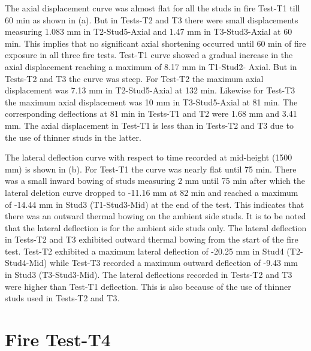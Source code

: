 The axial displacement curve was almost flat for all the studs in fire Test-T1 till 60 min as shown in  (a). But in Tests-T2 and T3 there were small displacements measuring 1.083 mm in T2-Stud5-Axial and 1.47 mm in T3-Stud3-Axial at 60 min. This implies that no significant axial shortening occurred until 60 min of fire exposure in all three fire tests. Test-T1 curve showed a gradual increase in the axial displacement reaching a maximum of 8.17 mm in T1-Stud2- Axial. But in Tests-T2 and T3 the curve was steep. For Test-T2 the maximum axial displacement was 7.13 mm in T2-Stud5-Axial at 132 min. Likewise for Test-T3 the maximum axial displacement was 10 mm in T3-Stud5-Axial at 81 min. The corresponding deflections at 81 min in Tests-T1 and T2 were 1.68 mm and 3.41 mm. The axial displacement in Test-T1 is less than in Tests-T2 and T3 due to the use of thinner studs in the latter.

The lateral deflection curve with respect to time recorded at mid-height (1500 mm) is shown in  (b). For Test-T1 the curve was nearly flat until 75 min. There was a small inward bowing of studs measuring 2 mm until 75 min after which the lateral deletion curve dropped to -11.16 mm at 82 min and reached a maximum of -14.44 mm in Stud3 (T1-Stud3-Mid) at the end of the test. This indicates that there was an outward thermal bowing on the ambient side studs. It is to be noted that the lateral deflection is for the ambient side studs only. The lateral deflection in Tests-T2 and T3 exhibited outward thermal bowing from the start of the fire test. Test-T2 exhibited a maximum lateral deflection of -20.25 mm in Stud4 (T2-Stud4-Mid) while Test-T3 recorded a maximum outward deflection of -9.43 mm in Stud3 (T3-Stud3-Mid). The lateral deflections recorded in Tests-T2 and T3 were higher than Test-T1 deflection. This is also because of the use of thinner studs used in Tests-T2 and T3.

\section{Fire Test-T4}

